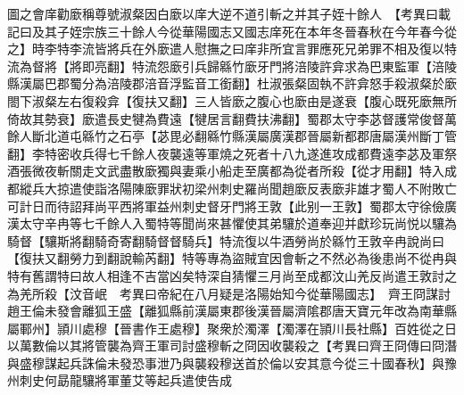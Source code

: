 圖之會庠勸廞稱尊號淑粲因白廞以庠大逆不道引斬之并其子姪十餘人　【考異曰載記曰及其子姪宗族三十餘人今從華陽國志又國志庠死在本年冬晉春秋在今年春今從之】時李特李流皆將兵在外廞遣人慰撫之曰庠非所宜言罪應死兄弟罪不相及復以特流為督將【將即亮翻】特流怨廞引兵歸緜竹廞牙門將涪陵許弇求為巴東監軍【涪陵縣漢屬巴郡蜀分為涪陵郡涪音浮監音工銜翻】杜淑張粲固執不許弇怒手殺淑粲於廞閤下淑粲左右復殺弇【復扶又翻】三人皆廞之腹心也廞由是遂衰【腹心既死廞無所倚故其勢衰】廞遣長史犍為費遠【犍居言翻費扶沸翻】蜀郡太守李苾督護常俊督萬餘人斷北道屯緜竹之石亭【苾毘必翻緜竹縣漢屬廣漢郡晉屬新都郡唐屬漢州斷丁管翻】李特密收兵得七千餘人夜襲遠等軍燒之死者十八九遂進攻成都費遠李苾及軍祭酒張微夜斬關走文武盡散廞獨與妻乘小船走至廣都為從者所殺【從才用翻】特入成都縱兵大掠遣使詣洛陽陳廞罪狀初梁州刺史羅尚聞趙廞反表廞非雄才蜀人不附敗亡可計日而待詔拜尚平西將軍益州刺史督牙門將王敦【此别一王敦】蜀郡太守徐儉廣漢太守辛冉等七千餘人入蜀特等聞尚來甚懼使其弟驤於道奉迎并獻珍玩尚悦以驤為騎督【驤斯將翻騎奇寄翻騎督督騎兵】特流復以牛酒勞尚於緜竹王敦辛冉說尚曰【復扶又翻勞力到翻說輸芮翻】特等專為盜賊宜因會斬之不然必為後患尚不從冉與特有舊謂特曰故人相逢不吉當凶矣特深自猜懼三月尚至成都汶山羌反尚遣王敦討之為羌所殺【汶音岷　考異曰帝紀在八月疑是洛陽始知今從華陽國志】　齊王冏謀討趙王倫未發會離狐王盛【離狐縣前漢屬東郡後漢晉屬濟隂郡唐天寶元年改為南華縣屬鄆州】頴川處穆【晉書作王處穆】聚衆於濁澤【濁澤在頴川長社縣】百姓從之日以萬數倫以其將管襲為齊王軍司討盛穆斬之冏因收襲殺之【考異曰齊王冏傳曰冏潛與盛穆謀起兵誅倫未發恐事泄乃與襲殺穆送首於倫以安其意今從三十國春秋】與豫州刺史何勗龍驤將軍董艾等起兵遣使告成

